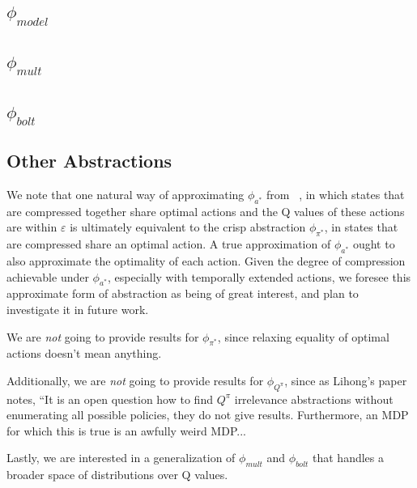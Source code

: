 \documentclass{article}
\begin{document}
\subsection{$\phi_{model}$}

\subsection{$\phi_{mult}$}

\subsection{$\phi_{bolt}$}

\subsection{Other Abstractions}

We note that one natural way of approximating $\phi_{a^*}$ from ~\cite{li2006towards}, in which states that are compressed together share optimal actions and the Q values of these actions are within $\varepsilon$ is ultimately equivalent to the crisp abstraction $\phi_{\pi^*}$, in states that are compressed share an optimal action. A true approximation of $\phi_{a^*}$ ought to also approximate the optimality of each action. Given the degree of compression achievable under $\phi_{a^*}$, especially with temporally extended actions, we foresee this approximate form of abstraction as being of great interest, and plan to investigate it in future work.

We are {\it not} going to provide results for $\phi_{\pi^*}$, since relaxing equality of optimal actions doesn't mean anything.

Additionally, we are {\it not} going to provide results for $\phi_{Q^\pi}$, since as Lihong's paper notes, ``It is an open question how to find $Q^\pi$ irrelevance abstractions without enumerating all possible policies, they do not give results. Furthermore, an MDP for which this is true is an awfully weird MDP...

Lastly, we are interested in a generalization of $\phi_{mult}$  and $\phi_{bolt}$ that handles a broader space of distributions over Q values.





\end{document}
